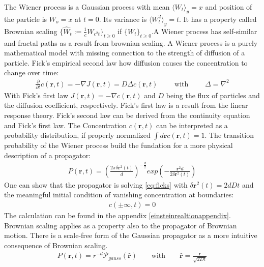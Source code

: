 \documentclass[
  a4paper,BCOR10mm,oneside,
  bibtotoc,idxtotoc,
  headsepline,footsepline,%
  fleqn,openbib
]{scrbook}
\begin{document}
The Wiener process is a Gaussian process with mean $\langle W_t \rangle_y=x$ and position of the particle is $W_o=x$ at $t=0$. Its variance is $\langle W^2_t \rangle_y= t$. It has a property called Brownian scaling $\{\hat{W}_t := \frac{1}{c} W_{c^2 t} \}_{t\geq0}$ if $\{W_t\}_{t \geq 0}$.A Wiener process has self-similar and fractal paths as a result from brownian scaling.\newline 
A Wiener process is a purely mathematical model with missing connection to the strength of diffusion of a particle. Fick's empirical second law how diffusion causes the concentration to change over time:
\begin{align}
 \frac{\partial}{\partial t} c(\bm{r},t) = - \nabla J (\bm{r},t) = D  \Delta c(\bm{r},t) \qquad \text{ with } \qquad \Delta= \nabla^2  \label{eq:ficks}
\end{align}
With Fick's first law $J(\bm{r},t)=- \nabla c(\bm{r},t)$ and $D$ being the flux of particles and the diffusion coefficient, respectively. Fick's first law is a result from the linear response theory. Fick's second law can be derived from the continuity equation and Fick's first law. The Concentration $c(\bm{r},t)$ can be interpreted as a probability distribution, if properly normalized  $\int d\bm{r} c(\bm{r},t)=1$. The transition probability of the Wiener process build the fundation for a more physical description of a propagator:
\begin{align}
 P(\bm{r},t)=  \left(\frac{2 \pi \delta \bm{r}^2(t)}{d}\right)^{- \frac{d}{2}} exp \left(- \frac{\bm{r}^2 d}{2 \delta \bm{r}^2(t)} \right) \label{propagator}
\end{align}
One can show that the propagator is solving \cref{eq:ficks} with $\delta \bm{r}^2(t)=2dDt$ and the meaningful initial condition of vanishing concentration at boundaries: 
\begin{align}
c(\pm \infty,t)=0
\end{align}
The calculation can be found in the appendix \ref{einsteinrealtionappendix}.
Brownian scaling applies as a property also to the propagator of Brownian motion.
There is a scale-free form of the Gaussian propagator as a more intuitive consequence of Brownian scaling. 
\begin{align}
P(\bm{r},t)= r^{-d} \mathcal{P}_{gauss}(\hat{\bm{r}})  \qquad \text{with} \qquad \hat{\bm{r}} = \frac{\bm{r}}{\sqrt{2Dt}} \label{scalefreeform}
\end{align}
\end{document}
